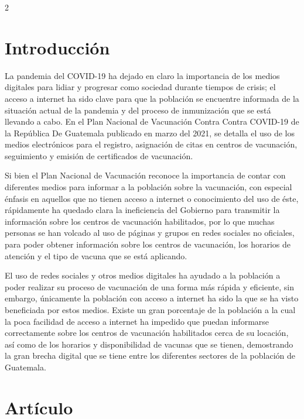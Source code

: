 \documentclass[12pt,spanish,Letterpaper,openany]{book}
\begin{document}
\begin {multicols}{2}

\hypertarget{introducciuxf3n-6}{%
\section{Introducción}\label{introducciuxf3n-6}}

La pandemia del COVID-19 ha dejado en claro la importancia de los medios digitales para
lidiar y progresar como sociedad durante tiempos de crisis; el acceso a internet ha sido clave
para que la población se encuentre informada de la situación actual de la pandemia y del
proceso de inmunización que se está llevando a cabo. En el Plan Nacional de Vacunación
Contra Contra COVID-19 de la República De Guatemala publicado en marzo del 2021, se
detalla el uso de los medios electrónicos para el registro, asignación de citas en centros de
vacunación, seguimiento y emisión de certificados de vacunación.

Si bien el Plan Nacional de Vacunación reconoce la importancia de contar con diferentes
medios para informar a la población sobre la vacunación, con especial énfasis en aquellos
que no tienen acceso a internet o conocimiento del uso de éste, rápidamente ha quedado clara
la ineficiencia del Gobierno para transmitir la información sobre los centros de vacunación
habilitados, por lo que muchas personas se han volcado al uso de páginas y grupos en redes
sociales no oficiales, para poder obtener información sobre los centros de vacunación, los
horarios de atención y el tipo de vacuna que se está aplicando.

El uso de redes sociales y otros medios digitales ha ayudado a la población a poder realizar
su proceso de vacunación de una forma más rápida y eficiente, sin embargo, únicamente la
población con acceso a internet ha sido la que se ha visto beneficiada por estos medios.
Existe un gran porcentaje de la población a la cual la poca facilidad de acceso a internet ha
impedido que puedan informarse correctamente sobre los centros de vacunación habilitados
cerca de su locación, así como de los horarios y disponibilidad de vacunas que se tienen,
demostrando la gran brecha digital que se tiene entre los diferentes sectores de la población
de Guatemala.

\hypertarget{artuxedculo-10}{%
\section{Artículo}\label{artuxedculo-10}}


\end{multicols}
\end{document}
